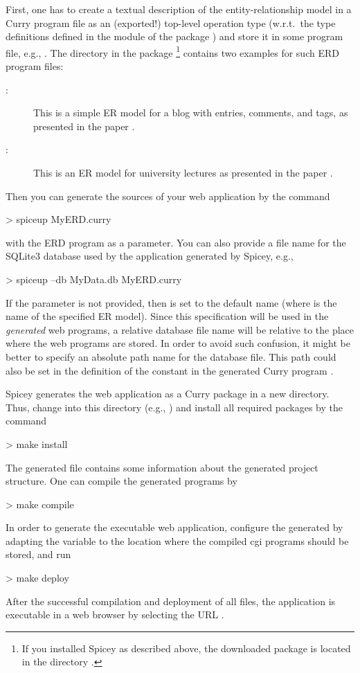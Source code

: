 First, one has to create a textual description of the
entity-relationship model
in a Curry program file as an (exported!) top-level operation type 
(w.r.t.\ the type definitions defined in the module 
of the package )
and store it in some program file, e.g., .
The directory  in the package \footnote{%
If you installed Spicey as described above,
the downloaded  package is located in the directory
.}
contains two examples for such ERD program files:
\begin{description}
\item[:]
This is a simple ER model for a blog with entries, comments,
and tags, as presented in the paper \cite{HanusKoschnicke14TPLP}.
\item[:]
This is an ER model for university lectures as
presented in the paper \cite{BrasselHanusMueller08PADL}.
\end{description}
%
Then you can generate the sources of your web application
by the command
\begin{curry}
> spiceup MyERD.curry
\end{curry}
with the ERD program as a parameter.
You can also provide a file name for the SQLite3 database used
by the application generated by Spicey, e.g.,
\begin{curry}
> spiceup --db MyData.db MyERD.curry
\end{curry}
If the parameter  is not provided,
then  is set to the default name 
(where  is the name of the specified ER model).
Since this specification will be used in the \emph{generated} web programs,
a relative database file name will be relative to the place where
the web programs are stored.
In order to avoid such confusion, it might be better to specify
an absolute path name for the database file.
This path could also be set in the definition of the constant
 in the generated Curry program
.

Spicey generates the web application as a Curry package in a new
directory. Thus, change into this directory (e.g., )
and install all required packages by the command
\begin{curry}
> make install
\end{curry}
%
The generated file  contains some information
about the generated project structure.
One can compile the generated programs by
\begin{curry}
> make compile
\end{curry}
In order to generate the executable web application,
configure the generated 
by adapting the variable  to the location
where the compiled cgi programs should be stored, and run
\begin{curry}
> make deploy
\end{curry}
After the successful compilation and deployment of all files,
the application is executable
in a web browser by selecting the URL .


